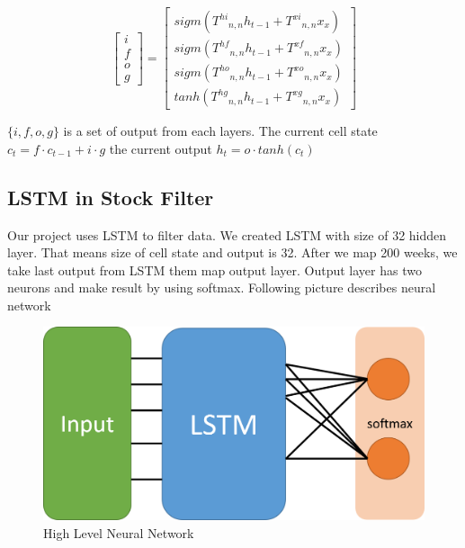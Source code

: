 \documentclass[prodmode,acmtecs]{acmsmall} %
\begin{document}
\begin{enumerate}
\[
\begin{bmatrix}
    i \\
    f \\
    o \\
    g
\end{bmatrix}
=
\begin{bmatrix}
    sigm({T^{hi}}_{n,n}h_{t-1} + {T^{xi}}_{n,n}x_{x}) \\
    sigm({T^{hf}}_{n,n}h_{t-1} + {T^{xf}}_{n,n}x_{x}) \\
    sigm({T^{ho}}_{n,n}h_{t-1} + {T^{xo}}_{n,n}x_{x}) \\
    tanh({T^{hg}}_{n,n}h_{t-1} + {T^{xg}}_{n,n}x_{x})
\end{bmatrix}
\]

$\{i, f, o, g\}$ is a set of output from each layers.
The current cell state $c_t = f \cdot c_{t-1} + i \cdot g$
the current output $h_t = o \cdot tanh(c_t)$

\end{enumerate}

\subsection{LSTM in Stock Filter}
Our project uses LSTM to filter data. We created LSTM with size of 32 hidden layer. That means size of cell state and output is 32. After we map 200 weeks, we take last output from LSTM them map output layer. Output layer has two neurons and make result by using softmax. Following picture describes neural network

\begin{figure}[H]
	\begin{center}
	\includegraphics[scale=0.7]{./pictures/FSFNN.png}
	\caption{High Level Neural Network}
	\label{GD}
	\end{center}
\end{figure}
\end{document}
